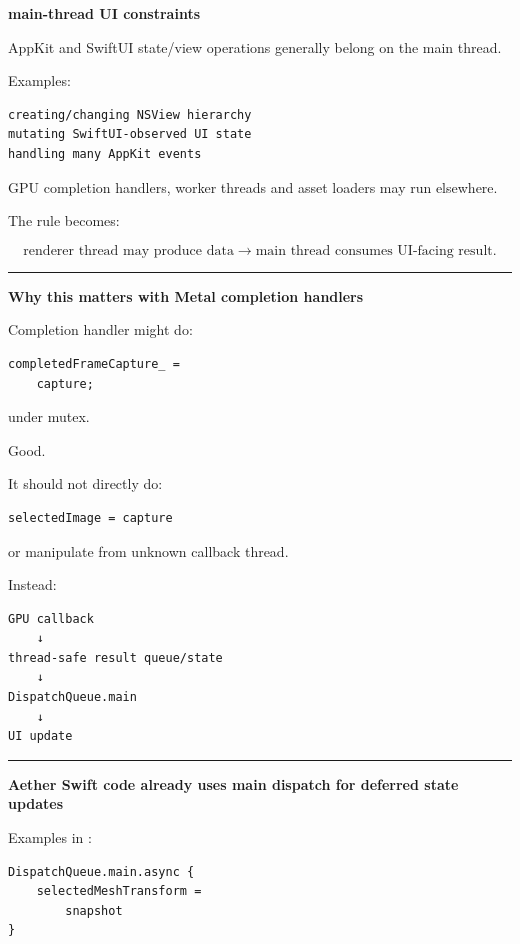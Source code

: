 \textbf{main-thread UI constraints}

AppKit and SwiftUI state/view operations generally belong on the main thread.

Examples:

\begin{verbatim}
creating/changing NSView hierarchy
mutating SwiftUI-observed UI state
handling many AppKit events
\end{verbatim}

GPU completion handlers, worker threads and asset loaders may run elsewhere.

The rule becomes:

\[
\boxed{
\text{renderer thread may produce data}
\rightarrow
\text{main thread consumes UI-facing result}.
}
\]

\begin{center}\rule{0.5\linewidth}{0.5pt}\end{center}

\textbf{Why this matters with Metal completion handlers}

Completion handler might do:

\begin{verbatim}
completedFrameCapture_ =
    capture;
\end{verbatim}

under mutex.

Good.

It should not directly do:

\begin{verbatim}
selectedImage = capture
\end{verbatim}

or manipulate  from unknown callback thread.

Instead:

\begin{verbatim}
GPU callback
    ↓
thread-safe result queue/state
    ↓
DispatchQueue.main
    ↓
UI update
\end{verbatim}

\begin{center}\rule{0.5\linewidth}{0.5pt}\end{center}

\textbf{Aether Swift code already uses main dispatch for deferred state updates}

Examples in :

\begin{verbatim}
DispatchQueue.main.async {
    selectedMeshTransform =
        snapshot
}
\end{verbatim}

